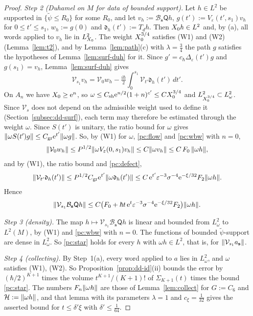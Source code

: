 \begin{proof}
\medskip\noindent\emph{Step 2 (Duhamel on $M$ for data of bounded support).} Let $h\in L^2$ be supported in $\{\tilde\psi\le R_0\}$ for some $R_0$, and let
$v_h:=\mathcal B_{\mathbf s}\mathsf Qh$, $g(t'):=V_\varepsilon(t',s_1)v_h$ for $0\le t'\le s_1$, $w_h:=g(0)$ and $\mathfrak d_h(t'):=T_dh$. Then $X_0 h\in L^2$ and, by (a), all
words applied to $v_h$ lie in $L^2_{X_0}$. The weight $X_0^{3/4}$ satisfies (W1) and (W2) (Lemma~\ref{lem:t2}), and by
Lemma~\ref{lem:path}(c) with $\lambda=\tfrac34$ the path $g$ satisfies the hypotheses of Lemma~\ref{lem:surf-duh} for it. Since
$g'=c_\hbar\Delta_\varepsilon(t')g$ and $g(s_1)=v_h$, Lemma~\ref{lem:surf-duh} gives
\[
  \mathcal V_{s_1}v_h=\mathcal V_0w_h-\tfrac{i\hbar}2\int_0^{s_1}\mathcal V_{t'}\mathfrak d_h(t')\,dt' .
\]
On $A_n$ we have $X_0\ge\mathrm{e}^n$, so $\omega\le C_{\mathrm{sh}}\mathrm{e}^{n/2}(1+n)^{c'}\le CX_0^{3/4}$ and $L^2_{X_0^{3/4}}\subset L^2_\omega$. Since
$\mathcal V_s$ does not depend on the admissible weight used to define it (Section~\ref{subsec:dd-surf}), each term may therefore be estimated
through the weight $\omega$. Since $S(t')$ is unitary, the ratio bound for $\omega$ gives
$\lVert \omega S(t')g\rVert\le C_{\mathrm{gr}}\mathrm{e}^{t'}\lVert \omega g\rVert$. So, by \textup{(W1)} for $\omega$, \eqref{pc:flow} and \eqref{pc:wbw} with $n=0$,
\[
  \lVert \mathcal V_0w_h\rVert\le P^{1/2}\lVert \omega V_\varepsilon(0,s_1)v_h\rVert\le C\lVert \omega v_h\rVert\le C\,F_0\,\lVert \omega h\rVert,
\]
and by \textup{(W1)}, the ratio bound and \eqref{pc:defect},
\[
  \lVert \mathcal V_{t'}\mathfrak d_h(t')\rVert\le P^{1/2}C_{\mathrm{gr}}\mathrm{e}^{t'}\lVert \omega \mathfrak d_h(t')\rVert\le C\,\mathrm{e}^{t'}\varepsilon^{-3}\sigma^{-4}\mathrm{e}^{-\xi/32}F_2\lVert \omega h\rVert.
\]
Hence
\begin{equation}\label{pc:star}
  \lVert \mathcal V_{s_1}\mathcal B_{\mathbf s}\mathsf Qh\rVert\le C\bigl(F_0+\hbar t\,\mathrm{e}^{t}\varepsilon^{-3}\sigma^{-4}\mathrm{e}^{-\xi/32}F_2\bigr)\lVert \omega h\rVert.
\end{equation}

\medskip\noindent\emph{Step 3 (density).} The map $h\mapsto\mathcal V_{s_1}\mathcal B_{\mathbf s}\mathsf Qh$ is linear and bounded from $L^2_\omega$ to $L^2(M)$, by
\textup{(W1)} and \eqref{pc:wbw} with $n=0$. The functions of bounded $\tilde\psi$-support are dense in $L^2_\omega$. So \eqref{pc:star} holds for
every $h$ with $\omega h\in L^2$, that is, for $\lVert \mathcal V_{s_1}a_{\mathbf s}\rVert$.

\medskip\noindent\emph{Step 4 (collecting).} By Step~1(a), every word applied to $a$ lies in $L^2_{\omega}$, and $\omega$ satisfies (W1), (W2). So
Proposition~\ref{prop:dd-id}(ii) bounds the error by $(\hbar/2)^{K+1}$ times the volume $t^{K+1}/(K+1)!$ of $\Sigma_{K+1}(t)$ times the bound
\eqref{pc:star}. The numbers $F_n\lVert \omega h\rVert$ are those of Lemma~\ref{lem:collect} for $G:=C_6$ and $\mathcal H:=\lVert \omega h\rVert$, and that
lemma with its parameters $\lambda=1$ and $c_\xi=\tfrac1{32}$ gives the asserted bound for $t\le\delta'\xi$ with $\delta'\le\tfrac1{64}$.


\end{proof}
